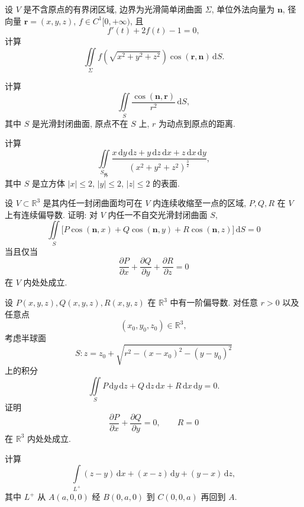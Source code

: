 \documentclass[../数学分析培优讲义.tex]{subfiles}
\begin{document}
\begin{example}
设 $V$ 是不含原点的有界闭区域, 边界为光滑简单闭曲面 $\Sigma$, 单位外法向量为 $\bm n$, 径向量 $\bm r=(x,y,z)$, $f\in C^1\lbrack0,+\infty)$, 且
\[
    f'(t)+2f(t)-1=0,
\]
计算
\[
    \iint\limits_\Sigma f\left(\sqrt{x^2+y^2+z^2}\right)\cos(\bm r,\bm n)\,\mathrm{d}S.
\]
\end{example}
\exampleblank

\begin{example}
计算
\[
    \iint\limits_S\dfrac{\cos(\bm n,\bm r)}{r^2}\,\mathrm{d}S,
\]
其中 $S$ 是光滑封闭曲面, 原点不在 $S$ 上, $r$ 为动点到原点的距离.
\end{example}
\exampleblank

\begin{example}
计算
\[
    \iint\limits_{S_{\text{外}}}\dfrac{x\,\mathrm{d}y\,\mathrm{d}z+y\,\mathrm{d}z\,\mathrm{d}x+z\,\mathrm{d}x\,\mathrm{d}y}{(x^2+y^2+z^2)^{\frac{3}{2}}},
\]
其中 $S$ 是立方体 $|x|\leq2$, $|y|\leq2$, $|z|\leq2$ 的表面.
\end{example}
\exampleblank

\begin{example}
设 $V\subset\mathbb{R}^3$ 是其内任一封闭曲面均可在 $V$ 内连续收缩至一点的区域, $P,Q,R$ 在 $V$ 上有连续偏导数. 证明: 对 $V$ 内任一不自交光滑封闭曲面 $S$,
\[
    \iint\limits_S\bigl\lbrack P\cos(\bm n,x)+Q\cos(\bm n,y)+R\cos(\bm n,z)\bigr\rbrack\,\mathrm{d}S=0
\]
当且仅当
\[
    \dfrac{\partial P}{\partial x}+\dfrac{\partial Q}{\partial y}+\dfrac{\partial R}{\partial z}=0
\]
在 $V$ 内处处成立.
\end{example}
\exampleblank

\begin{example}
设 $P(x,y,z),Q(x,y,z),R(x,y,z)$ 在 $\mathbb{R}^3$ 中有一阶偏导数. 对任意 $r>0$ 以及任意点
\[
    (x_0,y_0,z_0)\in\mathbb{R}^3,
\]
考虑半球面
\[
    S:z=z_0+\sqrt{r^2-(x-x_0)^2-(y-y_0)^2}
\]
上的积分
\[
    \iint\limits_S
    P\,\mathrm{d}y\,\mathrm{d}z
    +Q\,\mathrm{d}z\,\mathrm{d}x
    +R\,\mathrm{d}x\,\mathrm{d}y=0.
\]
证明
\[
    \dfrac{\partial P}{\partial x}+\dfrac{\partial Q}{\partial y}=0,
    \qquad R=0
\]
在 $\mathbb{R}^3$ 内处处成立.
\end{example}
\exampleblank

\begin{example}
计算
\[
    \int\limits_{L^+}(z-y)\,\mathrm{d}x+(x-z)\,\mathrm{d}y+(y-x)\,\mathrm{d}z,
\]
其中 $L^+$ 从 $A(a,0,0)$ 经 $B(0,a,0)$ 到 $C(0,0,a)$ 再回到 $A$.
\end{example}
\exampleblank
\end{document}
